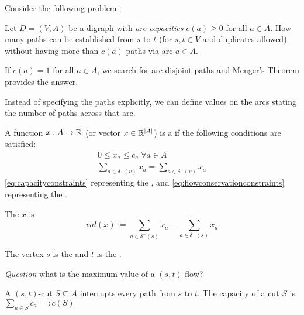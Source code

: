 \begin{lec}[2011-12-05]\end{lec}

Consider the following problem:

Let $D=(V,A)$ be a digraph with \emph{arc capacities} $c(a) \geq 0$ for all $a \in A$. How many paths can be established from $s$ to $t$ (for $s, t \in V$ and duplicates allowed) without having more than $c(a)$ paths via arc $a \in A$.

If $c(a) = 1$ for all $a \in A$, we search for arc-disjoint paths and Menger's Theorem provides the answer.

Instead of specifying the paths explicitly,  we can define values on the arcs stating the number of paths across that arc.

\begin{defn}
	A function $x: A \rightarrow \mathbb{R}$ (or vector $x \in \mathbb{R}^{|A|}$) is a  if the following conditions are satisfied:
	\begin{align}
		\label{eq:capacityconstraints} 0 \leq x_a \leq c_a \; \forall a \in A\\
		\label{eq:flowconservationconstraints}\sum\limits_{a \in \delta^+(v)}x_a = \sum\limits_{a \in \delta^-(v)}x_a
	\end{align}
	\eqref{eq:capacityconstraints} representing the , and \eqref{eq:flowconservationconstraints} representing the .
	
	The  $x$ is 
	\[
		val(x):=\sum\limits_{a \in \delta^+(s)}x_a - \sum\limits_{a \in \delta^-(s)}x_a
	\]
	
	The vertex $s$ is the  and $t$ is the .
\end{defn} 

\emph{Question} what is the maximum value of a $(s,t)$-flow?

A $(s,t)$-cut $S \subseteq A$ interrupts every path from $s$ to $t$. The capacity of a cut $S$ is $\sum\limits_{a \in S} c_a =: c(S)$

